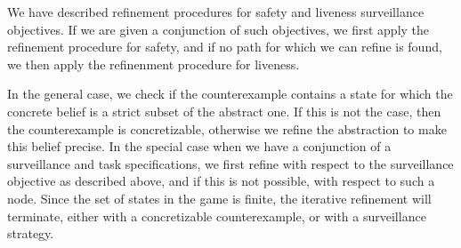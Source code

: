 We have described refinement procedures for safety and liveness surveillance objectives. If we are given a conjunction of such objectives, we first apply the refinement procedure for safety, and if no path for which we can refine is found, we then apply the refinenment procedure for liveness. 

In the general case, we check if the counterexample contains a state for which the concrete belief is a strict subset of the abstract one. If this is not the case, then the counterexample is concretizable, otherwise we refine the abstraction to make this belief precise. In the special case when we have a conjunction of a surveillance and task specifications, we first refine with respect to the surveillance objective as described above, and if this is not possible, with respect to such a node. Since the set of states in the game is finite, the iterative refinement will terminate, either with a concretizable counterexample, or with a surveillance strategy.  


